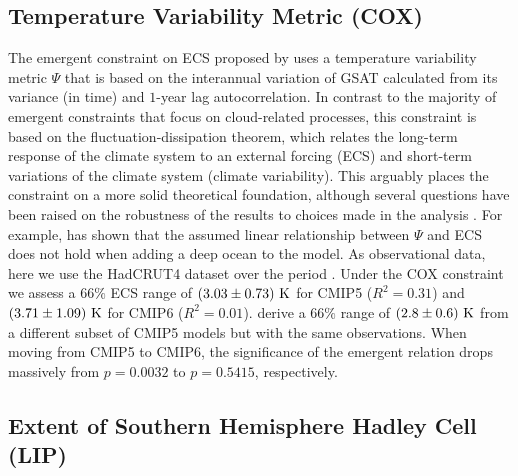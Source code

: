 \subsection{Temperature Variability Metric (COX)}
\label{subsec:05:cox}

The emergent constraint on \ac{ECS} proposed by \textcite{Cox2018} uses a
temperature variability metric $\Psi$ that is based on the interannual
variation of \ac{GSAT} calculated from its variance (in time) and $1$-year lag
autocorrelation. In contrast to the majority of emergent constraints that focus
on cloud-related processes, this constraint is based on the
fluctuation-dissipation theorem, which relates the long-term response of the
climate system to an external forcing (\ac{ECS}) and short-term variations of
the climate system (climate variability). This arguably places the constraint
on a more solid theoretical foundation, although several questions have been
raised on the robustness of the results to choices made in the analysis
\autocite{Brown2018, PoChedley2018, Rypdal2018}. For example,
\textcite{Annan2020} has shown that the assumed linear relationship between
$\Psi$ and \ac{ECS} does not hold when adding a deep ocean to the model. As
observational data, here we use the HadCRUT4 dataset \autocite{Morice2012} over
the period . Under the COX constraint we assess a $66
\unit{\%}$ \ac{ECS} range of $\pmrangeunit{3.03}{0.73}{K}$ for \acs{CMIP}5
($R^2 = 0.31$) and $\pmrangeunit{3.71}{1.09}{K}$ for \acs{CMIP}6 ($R^2 =
0.01$). \Textcite{Cox2018} derive a $66 \unit{\%}$ range of
$\pmrangeunit{2.8}{0.6}{K}$ from a different subset of \acs{CMIP}5 models but
with the same observations. When moving from \acs{CMIP}5 to \acs{CMIP}6, the
significance of the emergent relation drops massively from $p = 0.0032$ to $p =
0.5415$, respectively.


\subsection{Extent of Southern Hemisphere Hadley Cell (LIP)}
\label{subsec:05:lip}

